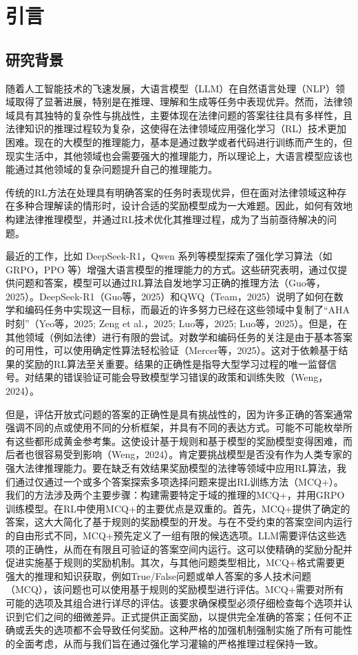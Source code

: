 \documentclass{pkuthesis}
\begin{document}
\newpage

\section{引言}
\subsection{研究背景}
随着人工智能技术的飞速发展，大语言模型（LLM）在自然语言处理（NLP）领域取得了显著进展，特别是在推理、理解和生成等任务中表现优异。然而，法律领域具有其独特的复杂性与挑战性，主要体现在法律问题的答案往往具有多样性，且法律知识的推理过程较为复杂，这使得在法律领域应用强化学习（RL）技术更加困难。现在的大模型的推理能力，基本是通过数学或者代码进行训练而产生的，但现实生活中，其他领域也会需要强大的推理能力，所以理论上，大语言模型应该也能通过其他领域的复杂问题提升自己的推理能力。

传统的RL方法在处理具有明确答案的任务时表现优异，但在面对法律领域这种存在多种合理解读的情形时，设计合适的奖励模型成为一大难题。因此，如何有效地构建法律推理模型，并通过RL技术优化其推理过程，成为了当前亟待解决的问题。

最近的工作，比如 DeepSeek-R1，Qwen 系列等模型探索了强化学习算法（如 GRPO，PPO 等）增强大语言模型的推理能力的方式。这些研究表明，通过仅提供问题和答案，模型可以通过RL算法自发地学习正确的推理方法（Guo等，2025）。DeepSeek-R1（Guo等，2025）和QWQ（Team，2025）说明了如何在数学和编码任务中实现这一目标，而最近的许多努力已经在这些领域中复制了“AHA时刻”（Yeo等，2025; Zeng et al.，2025; Luo等，2025; Luo等，2025）。但是，在其他领域（例如法律）进行有限的尝试。对数学和编码任务的关注是由于基本答案的可用性，可以使用确定性算法轻松验证（Mercer等，2025）。这对于依赖基于结果的奖励的RL算法至关重要。结果的正确性是指导大型学习过程的唯一监督信号。对结果的错误验证可能会导致模型学习错误的政策和训练失败（Weng，2024）。

但是，评估开放式问题的答案的正确性是具有挑战性的，因为许多正确的答案通常强调不同的点或使用不同的分析框架，并具有不同的表达方式。可能不可能枚举所有这些都形成黄金参考集。这使设计基于规则和基于模型的奖励模型变得困难，而后者也很容易受到影响（Weng，2024）。肯定要挑战模型是否没有作为人类专家的强大法律推理能力。要在缺乏有效结果奖励模型的法律等领域中应用RL算法，我们通过仅通过一个或多个答案探索多项选择问题来提出RL训练方法（MCQ+）。我们的方法涉及两个主要步骤：构建需要特定于域的推理的MCQ+，并用GRPO训练模型。在RL中使用MCQ+的主要优点是双重的。首先，MCQ+提供了确定的答案，这大大简化了基于规则的奖励模型的开发。与在不受约束的答案空间内运行的自由形式不同，MCQ+预先定义了一组有限的候选选项。LLM需要评估这些选项的正确性，从而在有限且可验证的答案空间内运行。这可以使精确的奖励分配并促进实施基于规则的奖励机制。其次，与其他问题类型相比，MCQ+格式需要更强大的推理和知识获取，例如True/False问题或单人答案的多人技术问题（MCQ），该问题也可以使用基于规则的奖励模型进行评估。MCQ+需要对所有可能的选项及其组合进行详尽的评估。该要求确保模型必须仔细检查每个选项并认识到它们之间的细微差异。正式提供正面奖励，以提供完全准确的答案；任何不正确或丢失的选项都不会导致任何奖励。这种严格的加强机制强制实施了所有可能性的全面考虑，从而与我们旨在通过强化学习灌输的严格推理过程保持一致。
\end{document}
